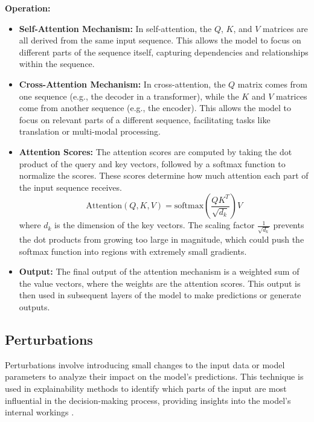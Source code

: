 \documentclass[../report.tex]{subfiles}
\begin{document}
    \textbf{Operation:}
    \begin{itemize}
        \item \textbf{Self-Attention Mechanism:} In self-attention, the $Q$, $K$, and $V$ matrices are all derived from the same input sequence. This allows the model to focus on different parts of the sequence itself, capturing dependencies and relationships within the sequence.
        
        \item \textbf{Cross-Attention Mechanism:} In cross-attention, the $Q$ matrix comes from one sequence (e.g., the decoder in a transformer), while the $K$ and $V$ matrices come from another sequence (e.g., the encoder). This allows the model to focus on relevant parts of a different sequence, facilitating tasks like translation or multi-modal processing.
        
        \item \textbf{Attention Scores:} The attention scores are computed by taking the dot product of the query and key vectors, followed by a softmax function to normalize the scores. These scores determine how much attention each part of the input sequence receives.
        \begin{equation}
            \text{Attention}(Q, K, V) = \text{softmax}\left(\frac{QK^T}{\sqrt{d_k}}\right)V
            \label{eq:attention}
        \end{equation}
        where $d_k$ is the dimension of the key vectors. The scaling factor $\frac{1}{\sqrt{d_k}}$ prevents the dot products from growing too large in magnitude, which could push the softmax function into regions with extremely small gradients.
        \item \textbf{Output:} The final output of the attention mechanism is a weighted sum of the value vectors, where the weights are the attention scores. This output is then used in subsequent layers of the model to make predictions or generate outputs.
    \end{itemize}

    \subsection{Perturbations}
    Perturbations involve introducing small changes to the input data or model parameters to analyze their impact on the model's predictions. This technique is used in explainability methods to identify which parts of the input are most influential in the decision-making process, providing insights into the model's internal workings \cite{molnar2020interpretable}.
\end{document}
